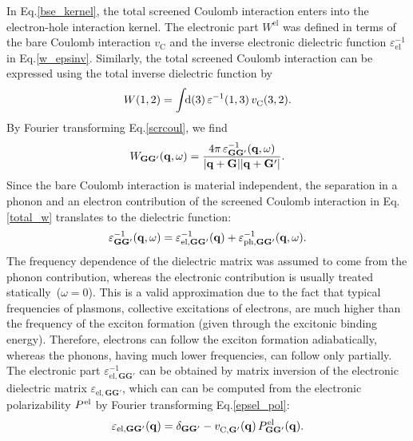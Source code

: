 In Eq.\;\eqref{bse_kernel}, the total screened Coulomb interaction enters into the electron-hole interaction kernel.  The electronic part $W^\text{el}$  was defined in terms of the bare Coulomb interaction $v_\text{C}^{\phantom{I}}$ and the  inverse electronic dielectric function $\varepsilon^{-1}_\text{el}$  in Eq.\;\eqref{w_epsinv}. Similarly, the total screened Coulomb interaction can  be expressed using  the total inverse dielectric function by
%
 \begin{align}\label{scrcoul}
     W(1,2) = \int\text{\!\!d}(3)\,\varepsilon^{-1}(1,3)\,v_\text{C}^{\phantom{I}}(3,2).
 \end{align}
% 
By Fourier transforming Eq.\;\eqref{scrcoul}, we find 
% 
  \begin{equation}\label{w_rec}
     W_\mathbf{GG'}(\mathbf{q},\omega) = \frac{4\pi\,\varepsilon^{-1}_\mathbf{GG'}(\mathbf{q},\omega)}{|\mathbf{q+G}||\mathbf{q+G'}|}.
 \end{equation}
%
Since the bare Coulomb interaction is material independent, the separation in a phonon and an electron contribution of the screened Coulomb interaction in Eq.\;\eqref{total_w} translates to the dielectric function:
%
  \begin{equation}\label{eps_elph}
 \varepsilon^{-1}_\mathbf{GG'}(\mathbf{q},\omega) =  \varepsilon^{-1}_{\text{el},\mathbf{GG'}}(\mathbf{q}) +  \varepsilon^{-1}_{\text{ph},\mathbf{GG'}}(\mathbf{q},\omega).
 \end{equation}
%
The frequency dependence of the dielectric matrix was assumed to come from the phonon contribution, whereas the electronic contribution is usually treated statically~($\omega=0$). This is a valid approximation due to the fact that typical frequencies of plasmons, collective excitations of electrons, are much higher than the frequency of the exciton formation (given through the excitonic binding energy)\cite{rohlf_louie_2000,bechstedt2016many}. Therefore, electrons can follow the exciton formation adiabatically, whereas the phonons, having much lower frequencies, can follow only partially. The electronic part $\varepsilon^{-1}_{\text{el},\mathbf{GG'}}$ can be obtained by matrix inversion of the electronic dielectric matrix $\varepsilon_{\text{el},\mathbf{GG'}}$, which can can be computed from the electronic polarizability $ P^{\hspace{.2mm}\text{el}}$ by Fourier transforming Eq.\;\eqref{epsel_pol}:
%
\begin{equation}\label{eps_polarization}
    \varepsilon_{\text{el},\mathbf{GG'}}(\mathbf{q}) = \delta_\mathbf{GG'} - v_{\text{C},\mathbf{G'}}^{\phantom{I}}(\mathbf{q})\, P^{\hspace{.2mm}\text{el}}_\mathbf{GG'}(\mathbf{q}).
\end{equation}
